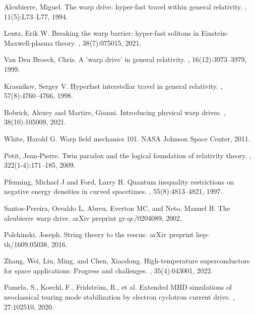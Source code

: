 \documentclass[12pt,a4paper]{article}
\begin{document}
\begin{thebibliography}{99}

Alcubierre, Miguel.
\newblock The warp drive: hyper-fast travel within general relativity.
, 11(5):L73--L77, 1994.

Lentz, Erik W.
\newblock Breaking the warp barrier: hyper-fast solitons in Einstein-Maxwell-plasma theory.
, 38(7):075015, 2021.

Van Den Broeck, Chris.
\newblock A 'warp drive' in general relativity.
, 16(12):3973--3979, 1999.

Krasnikov, Sergey V.
\newblock Hyperfast interstellar travel in general relativity.
, 57(8):4760--4766, 1998.

Bobrick, Alexey and Martire, Gianni.
\newblock Introducing physical warp drives.
, 38(10):105009, 2021.

White, Harold G.
\newblock Warp field mechanics 101.
\newblock NASA Johnson Space Center, 2011.

Petit, Jean-Pierre.
\newblock Twin paradox and the logical foundation of relativity theory.
, 322(1-4):171--185, 2009.

Pfenning, Michael J and Ford, Larry H.
\newblock Quantum inequality restrictions on negative energy densities in curved spacetimes.
, 55(8):4813--4821, 1997.

Santos-Pereira, Osvaldo L, Abreu, Everton MC, and Neto, Manuel B.
\newblock The alcubierre warp drive.
\newblock arXiv preprint gr-qc/0204089, 2002.

Polchinski, Joseph.
\newblock String theory to the rescue.
\newblock arXiv preprint hep-th/1609.05038, 2016.

Zhang, Wei, Liu, Ming, and Chen, Xiaodong.
\newblock High-temperature superconductors for space applications: Progress and challenges.
, 35(4):043001, 2022.

Pamela, S., Koechl, F., Fridström, R., et al.
\newblock Extended MHD simulations of neoclassical tearing mode stabilization by electron cyclotron current drive.
, 27:102510, 2020.


\end{thebibliography}
\end{document}
